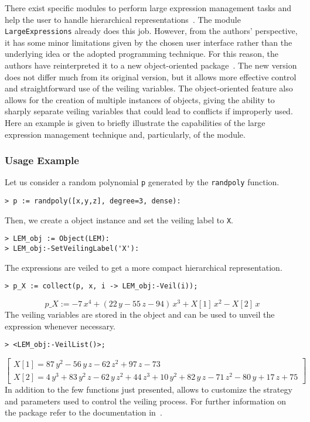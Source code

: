 There exist specific modules to perform large expression management tasks and help the user to handle hierarchical representations~\cite{carette2006linear,zhou2007symbolic}. The \Maple{} module \texttt{LargeExpressions} already does this job. However, from the authors' perspective, it has some minor limitations given by the chosen user interface rather than the underlying idea or the adopted programming technique. For this reason, the authors have reinterpreted it to a new object-oriented \LEM{} package~\cite{lem2023source}. The new version does not differ much from its original version, but it allows more effective control and straightforward use of the veiling variables. The object-oriented feature also allows for the creation of multiple instances of \LEM{} objects, giving the ability to sharply separate veiling variables that could lead to conflicts if improperly used. Here an example is given to briefly illustrate the capabilities of the large expression management technique and, particularly, of the \LEM{} module.

\subsubsection{Usage Example}

Let us consider a random polynomial \texttt{p} generated by the \texttt{randpoly} function.
%
\begin{verbatim}
> p := randpoly([x,y,z], degree=3, dense):
\end{verbatim}
%
Then, we create a \LEM{} object instance and set the veiling label to \texttt{X}.
%
\begin{verbatim}
> LEM_obj := Object(LEM):
> LEM_obj:-SetVeilingLabel('X'):
\end{verbatim}
%
The expressions are veiled to get a more compact hierarchical representation.
%
\begin{verbatim}
> p_X := collect(p, x, i -> LEM_obj:-Veil(i));
\end{verbatim}
\begin{equation*}
    p\_X := -7\,x^4 + (22\,y - 55\,z - 94)\,x^3 + X[1]\,x^2 - X[2]\,x
\end{equation*}
%
The veiling variables are stored in the \LEM{} object and can be used to unveil the expression whenever necessary.
%
\begin{verbatim}
> <LEM_obj:-VeilList()>;
\end{verbatim}
\begin{equation*}
  \begin{bmatrix}
      X[1] = 87\,y^2 - 56\,y\,z - 62\,z^2 + 97\,z - 73 \\[1mm]
      X[2] = 4\,y^3 + 83\,y^2\,z - 62\,y\,z^2 + 44\,z^3 + 10\,y^2 + 82\,y\,z - 71\,z^2 - 80\,y + 17\,z + 75
    \end{bmatrix}
\end{equation*}
%
In addition to the few functions just presented, \LEM{} allows to customize the strategy and parameters used to control the veiling process. For further information on the \LEM{} package refer to the documentation in~\cite{lem2023source}.

